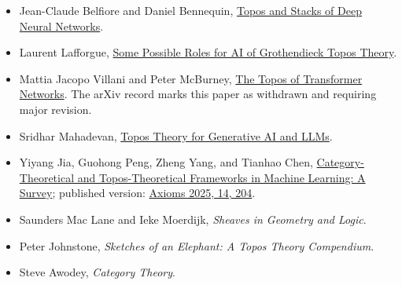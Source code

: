 \documentclass[11pt]{article}
\begin{document}
\begin{itemize}
\item Jean-Claude Belfiore and Daniel Bennequin,
\href{https://arxiv.org/abs/2106.14587}{Topos and Stacks of Deep Neural Networks}.

\item Laurent Lafforgue,
\href{https://www.laurentlafforgue.org/Expose_Lafforgue_topos_AI_ETH_sept_2022.pdf}{Some Possible Roles for AI of Grothendieck Topos Theory}.

\item Mattia Jacopo Villani and Peter McBurney,
\href{https://arxiv.org/abs/2403.18415}{The Topos of Transformer Networks}. The arXiv record marks this paper as withdrawn and requiring major revision.

\item Sridhar Mahadevan,
\href{https://arxiv.org/abs/2508.08293}{Topos Theory for Generative AI and LLMs}.

\item Yiyang Jia, Guohong Peng, Zheng Yang, and Tianhao Chen,
\href{https://arxiv.org/abs/2408.14014}{Category-Theoretical and Topos-Theoretical Frameworks in Machine Learning: A Survey}; published version: \href{https://doi.org/10.3390/axioms14030204}{Axioms 2025, 14, 204}.

\item Saunders Mac Lane and Ieke Moerdijk, \emph{Sheaves in Geometry and Logic}.
\item Peter Johnstone, \emph{Sketches of an Elephant: A Topos Theory Compendium}.
\item Steve Awodey, \emph{Category Theory}.
\end{itemize}
\end{document}
